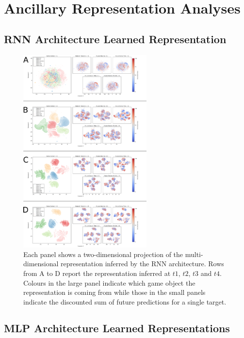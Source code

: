 \chapter{Ancillary Representation Analyses}

\section{RNN Architecture Learned Representation}
\label{rnn_architecture_representations}

\begin{figure}[!htb]
\includegraphics[width=0.6\textwidth]{images/appendix_D/rnn_beha_umap.png}
\centering
\caption[\textbf{Lower dimensional representation of the latent representations generated by the RNN architecture}]{Each panel shows a two-dimensional projection of the multi-dimensional representation inferred by the RNN architecture. Rows from A to D report the representation inferred at $t1$, $t2$, $t3$ and $t4$. Colours in the large panel indicate which game object the representation is coming from while those in the small panels indicate the discounted sum of future predictions for a single target.}
\end{figure}
\FloatBarrier

\section{MLP Architecture Learned Representations}
\label{mlp_architecture_representations}

